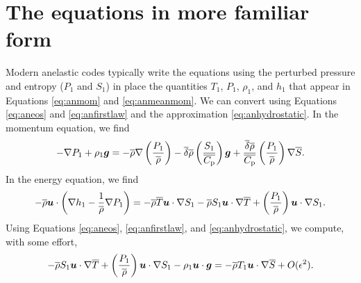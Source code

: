 \documentclass[12pt]{article}
\newcommand{\deltaref}{\overline{\delta}}
\newcommand{\cpref}{\overline{\cpcap}}
\begin{document}
\section{The \citet{Gough1969} equations in more familiar form}
Modern anelastic codes typically write the equations using the perturbed pressure and entropy ($P_1$ and $S_1$) in place the quantities $T_1$, $P_1$, $\rho_1$, and $h_1$ that appear in Equations \eqref{eq:anmom} and \eqref{eq:anmeanmom}. We can convert using Equations \eqref{eq:aneos} and \eqref{eq:anfirstlaw} and the approximation \eqref{eq:anhydrostatic}. In the momentum equation, we find
\begin{align}\label{eq:anrhsmom}
	-\nabla P_1 + \rho_1\vecg = -\rhoref\nabla\left(\frac{P_1}{\rhoref}\right) - \deltaref \rhoref \left(\frac{S_1}{\cpref}\right) \vecg + \frac{\deltaref\rhoref}{\cpref} \left(\frac{P_1}{\rhoref}\right)\nabla\sref.
\end{align}
In the energy equation, we find
\begin{align}\label{eq:anrhsen}
	-\overline{\rho}\bm{u}\cdot\left(\nabla h_1-\frac{1}{\overline{\rho}}\nabla P_1\right) = -\overline{\rho}\overline{T}\bm{u}\cdot\nabla S_1 - \overline{\rho} S_1\bm{u}\cdot\nabla\overline{T} + \left(\frac{P_1}{\overline{\rho}}\right)\bm{u}\cdot\nabla S_1.
\end{align}
Using Equations \eqref{eq:aneos}, \eqref{eq:anfirstlaw}, and \eqref{eq:anhydrostatic}, we compute, with some effort,
\begin{align}\label{eq:anrhsen2}
	- \overline{\rho} S_1\bm{u}\cdot\nabla\overline{T} + \left(\frac{P_1}{\overline{\rho}}\right)\bm{u}\cdot\nabla S_1 -\rho_1\bm{u}\cdot\bm{g} = -\overline{\rho} T_1\bm{u}\cdot\nabla\overline{S} + O(\epsilon^2).
\end{align}
\end{document}

